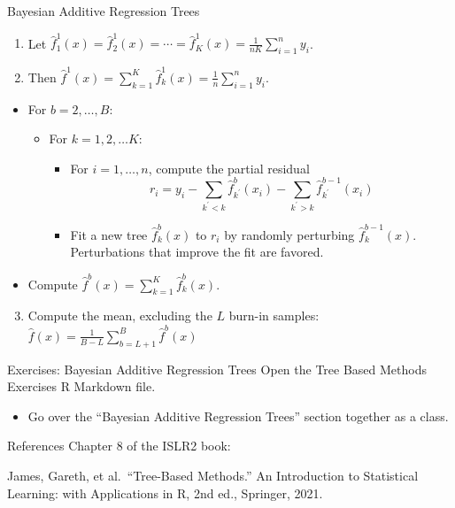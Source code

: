 \documentclass[
  ignorenonframetext,
  aspectratio=169,
]{beamer}
\providecommand{\tightlist}{%
  \setlength{\itemsep}{0pt}\setlength{\parskip}{0pt}}\usepackage{longtable,booktabs,array}
\begin{document}
\begin{frame}{Bayesian Additive Regression Trees}
\protect\hypertarget{bayesian-additive-regression-trees-2}{}
\begin{enumerate}
\item
  Let
  \(\hat{f}_{1}^{1}(x)=\hat{f}_{2}^{1}(x)=\cdots=\hat{f}_{K}^{1}(x)=\frac{1}{n K} \sum_{i=1}^{n} y_{i}\).
\item
  Then
  \(\hat{f}^{1}(x)=\sum_{k=1}^{K} \hat{f}_{k}^{1}(x)=\frac{1}{n} \sum_{i=1}^{n} y_{i}\).
\end{enumerate}

\begin{itemize}
\item
  For \(b = 2,\dots, B\):

  \begin{itemize}
  \item
    For \(k = 1, 2, \dots K\):

    \begin{itemize}
    \item
      For \(i = 1, \dots, n\), compute the partial residual
      \[r_{i}=y_{i}-\sum_{k^{\prime}<k} \hat{f}_{k^{\prime}}^{b}\left(x_{i}\right)-\sum_{k^{\prime}>k} \hat{f}_{k^{\prime}}^{b-1}\left(x_{i}\right)\]
    \item
      Fit a new tree \(\hat{f}_{k}^{b}(x)\) to \(r_i\) by randomly
      perturbing \(\hat{f}_{k}^{b-1}(x)\). Perturbations that improve
      the fit are favored.
    \end{itemize}
  \end{itemize}
\item
  Compute \(\hat{f}^{b}(x)=\sum_{k=1}^{K} \hat{f}_{k}^{b}(x)\).
\end{itemize}

\begin{enumerate}
\setcounter{enumi}{2}
\tightlist
\item
  Compute the mean, excluding the \(L\) burn-in samples:
  ~~\(\hat{f}(x)=\frac{1}{B-L} \sum_{b=L+1}^{B} \hat{f}^{b}(x)\)
\end{enumerate}
\end{frame}

\begin{frame}{Exercises: Bayesian Additive Regression Trees}
\protect\hypertarget{exercises-bayesian-additive-regression-trees}{}
Open the Tree Based Methods Exercises R Markdown file.

\begin{itemize}
\tightlist
\item
  Go over the ``Bayesian Additive Regression Trees'' section together as
  a class.
\end{itemize}
\end{frame}

\begin{frame}{References}
\protect\hypertarget{references}{}
Chapter 8 of the ISLR2 book:

James, Gareth, et al.~``Tree-Based Methods.'' An Introduction to
Statistical Learning: with Applications in R, 2nd ed., Springer, 2021.
\end{frame}
\end{document}

